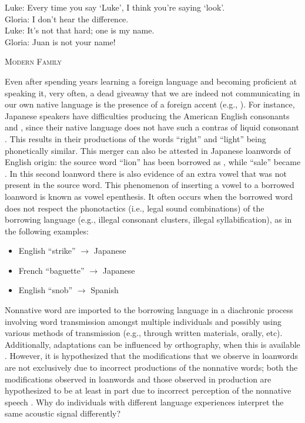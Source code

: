 
\setlength{\epigraphwidth}{0.7\textwidth}
\epigraph{Luke: Every time you say `Luke', I think you're saying `look'. \\ Gloria: I don't hear the difference. \\ Luke: It's not that hard; one is my name. \\ Gloria: Juan is not your name!}{\textsc{Modern Family}}

Even after spending years learning a foreign language and becoming proficient at speaking it, very often, a dead giveaway that we are indeed not communicating in our own native language is the presence of a foreign accent (e.g., \cite{flege1995factors, munro1996}). For instance, Japanese speakers have difficulties producing the American English consonants  and , since their native language does not have such a contras of liquid consonant \cite{flege1995rl}. This results in their productions of the words ``right'' and ``light'' being phonetically similar. This merger can also be attested in Japanese loanwords of English origin: the source word ``lion'' has been borrowed as , while ``sale'' became . In this second loanword there is also evidence of an extra  vowel that was not present in the source word. This phenomenon of inserting a vowel to a borrowed loanword is known as vowel epenthesis. It often occurs when the borrowed word does not respect the phonotactics (i.e., legal sound combinations) of the borrowing language (e.g., illegal consonant clusters, illegal syllabification), as in the following examples:
\begin{itemize}
  \item English ``strike''  $\rightarrow$ Japanese 
  \item French ``baguette''  $\rightarrow$ Japanese  %
  \item English ``snob''  $\rightarrow$ Spanish 
  \end{itemize}

Nonnative word are imported to the borrowing language in a diachronic process involving word transmission amongst multiple individuals and possibly using various methods of transmission (e.g., through written materials, orally, etc). Additionally, adaptations can be influenced by orthography, when this is available \cite{daland2015,vendelin2006}. However, it is hypothesized that the modifications that we observe in loanwords are not exclusively due to incorrect productions of the nonnative words; both the modifications observed in loanwords and those observed in production are hypothesized to be at least in part due to incorrect perception of the nonnative speech \cite{peperkamp2003, peperkamp2005, peperkamp2008, wilson2013,wilson2014}.  Why do individuals with different language experiences interpret the same acoustic signal differently?

